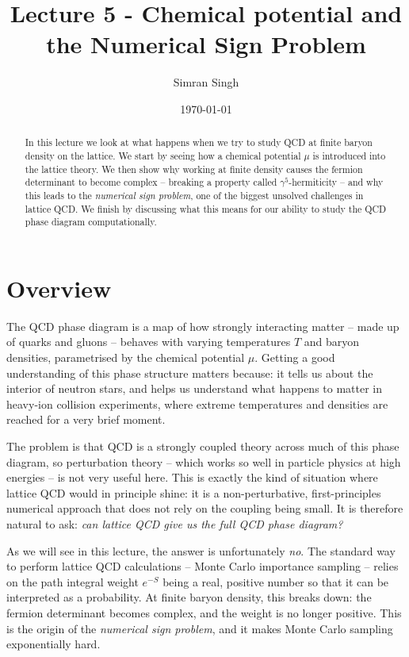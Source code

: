 \documentclass[11pt]{article}
\title{Lecture 5 - Chemical potential and the Numerical Sign Problem}
\author{Simran Singh}
\date{\today}
\theoremstyle{definition}
\begin{document}
\maketitle

\begin{abstract}
In this lecture we look at what happens when we try to study QCD at finite baryon density on the lattice. We start by seeing how a chemical potential $\mu$ is introduced into the lattice theory. We then show why working at finite density causes the fermion determinant to become complex -- breaking a property called $\gamma^5$-hermiticity -- and why this leads to the \textit{numerical sign problem}, one of the biggest unsolved challenges in lattice QCD. We finish by discussing what this means for our ability to study the QCD phase diagram computationally.
\end{abstract}

\section{Overview}
The QCD phase diagram is a map of how strongly interacting matter -- made up of quarks and gluons -- behaves with varying temperatures $T$ and baryon densities, parametrised by the chemical potential $\mu$. Getting a good understanding of this phase structure matters because: it tells us about the interior of neutron stars, and helps us understand what happens to matter in heavy-ion collision experiments, where extreme temperatures and densities are reached for a very brief moment. 

The problem is that QCD is a strongly coupled theory across much of this phase diagram, so perturbation theory -- which works so well in particle physics at high energies -- is not very useful here. This is exactly the kind of situation where lattice QCD would in principle shine: it is a non-perturbative, first-principles numerical approach that does not rely on the coupling being small. It is therefore natural to ask: \textit{can lattice QCD give us the full QCD phase diagram?}

As we will see in this lecture, the answer is unfortunately \textit{no}. The standard way to perform lattice QCD calculations -- Monte Carlo importance sampling -- relies on the path integral weight $e^{-S}$ being a real, positive number so that it can be interpreted as a probability. At finite baryon density, this breaks down: the fermion determinant becomes complex, and the weight is no longer positive. This is the origin of the \textit{numerical sign problem}, and it makes Monte Carlo sampling exponentially hard. 
\end{document}
